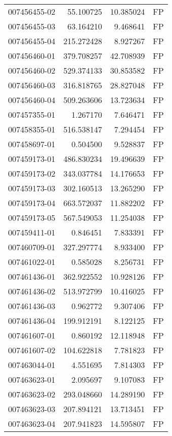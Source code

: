 \begin{tabular}{lrrl}
007456455-02 &   55.100725 &    10.385024 &   FP \\
007456455-03 &   63.164210 &     9.468641 &   FP \\
007456455-04 &  215.272428 &     8.927267 &   FP \\
007456460-01 &  379.708257 &    42.708939 &   FP \\
007456460-02 &  529.374133 &    30.853582 &   FP \\
007456460-03 &  316.818765 &    28.827048 &   FP \\
007456460-04 &  509.263606 &    13.723634 &   FP \\
007457355-01 &    1.267170 &     7.646471 &   FP \\
007458355-01 &  516.538147 &     7.294454 &   FP \\
007458697-01 &    0.504500 &     9.528837 &   FP \\
007459173-01 &  486.830234 &    19.496639 &   FP \\
007459173-02 &  343.037784 &    14.176653 &   FP \\
007459173-03 &  302.160513 &    13.265290 &   FP \\
007459173-04 &  663.572037 &    11.882202 &   FP \\
007459173-05 &  567.549053 &    11.254038 &   FP \\
007459411-01 &    0.846451 &     7.833391 &   FP \\
007460709-01 &  327.297774 &     8.933400 &   FP \\
007461022-01 &    0.585028 &     8.256731 &   FP \\
007461436-01 &  362.922552 &    10.928126 &   FP \\
007461436-02 &  513.972799 &    10.416025 &   FP \\
007461436-03 &    0.962772 &     9.307406 &   FP \\
007461436-04 &  199.912191 &     8.122125 &   FP \\
007461607-01 &    0.860192 &    12.118948 &   FP \\
007461607-02 &  104.622818 &     7.781823 &   FP \\
007463044-01 &    4.551695 &     7.814303 &   FP \\
007463623-01 &    2.095697 &     9.107083 &   FP \\
007463623-02 &  293.048660 &    14.289190 &   FP \\
007463623-03 &  207.894121 &    13.713451 &   FP \\
007463623-04 &  207.941823 &    14.595807 &   FP \\

\end{tabular}
